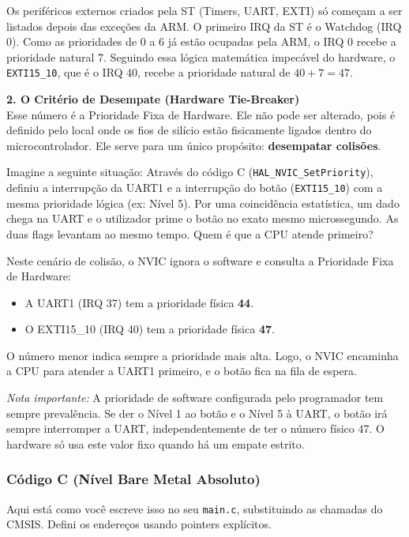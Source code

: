 \documentclass[12pt,a4paper]{article}
\begin{document}
Os periféricos externos criados pela ST (Timers, UART, EXTI) só começam a ser listados depois das exceções da ARM.
O primeiro IRQ da ST é o Watchdog (IRQ 0). Como as prioridades de 0 a 6 já estão ocupadas pela ARM, o IRQ 0 recebe a prioridade natural 7.
Seguindo essa lógica matemática impecável do hardware, o \texttt{EXTI15\_10}, que é o IRQ 40, recebe a prioridade natural de $40 + 7 = 47$.

\textbf{2. O Critério de Desempate (Hardware Tie-Breaker)}\\
Esse número é a Prioridade Fixa de Hardware. Ele não pode ser alterado, pois é definido pelo local onde os fios de silício estão fisicamente ligados dentro do microcontrolador. Ele serve para um único propósito: \textbf{desempatar colisões}.

Imagine a seguinte situação:
Através do código C (\texttt{HAL\_NVIC\_SetPriority}), definiu a interrupção da UART1 e a interrupção do botão (\texttt{EXTI15\_10}) com a mesma prioridade lógica (ex: Nível 5). Por uma coincidência estatística, um dado chega na UART e o utilizador prime o botão no exato mesmo microssegundo. As duas flags levantam ao mesmo tempo. Quem é que a CPU atende primeiro?

Neste cenário de colisão, o NVIC ignora o software e consulta a Prioridade Fixa de Hardware:
\begin{itemize}
    \item A UART1 (IRQ 37) tem a prioridade física \textbf{44}.
    \item O EXTI15\_10 (IRQ 40) tem a prioridade física \textbf{47}.
\end{itemize}
O número menor indica sempre a prioridade mais alta. Logo, o NVIC encaminha a CPU para atender a UART1 primeiro, e o botão fica na fila de espera.

\textit{Nota importante:} A prioridade de software configurada pelo programador tem sempre prevalência. Se der o Nível 1 ao botão e o Nível 5 à UART, o botão irá sempre interromper a UART, independentemente de ter o número físico 47. O hardware só usa este valor fixo quando há um empate estrito.

\subsubsection*{Código C (Nível Bare Metal Absoluto)}
Aqui está como você escreve isso no seu \texttt{main.c}, substituindo as chamadas do CMSIS. Defini os endereços usando pointers explícitos.
\end{document}
